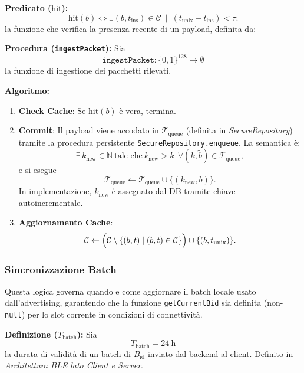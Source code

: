 \documentclass[a4paper,11pt,table,dvipsnames]{article}
\begin{document}
\textbf{Predicato (\(\text{hit}\)):}
\[
    \text{hit}(b) \iff \exists (b, t_{\text{ins}}) \in \mathcal{C}\ \mid\ (t_{\text{unix}} - t_{\text{ins}}) < \tau.
\]
la funzione che verifica la presenza recente di un payload, definita da:

\textbf{Procedura (\texttt{ingestPacket}):}
Sia
\[
    \texttt{ingestPacket}: \{0,1\}^{128} \rightarrow \emptyset
\]
la funzione di ingestione dei pacchetti rilevati.

\textbf{Algoritmo:}
\begin{enumerate}
    \item \textbf{Check Cache}:
          Se \(\text{hit}(b)\) è vera, termina.

    \item \textbf{Commit}:
          Il payload viene accodato in \(\mathcal{T}_{\text{queue}}\) (definita in \emph{SecureRepository}) tramite la procedura persistente \texttt{SecureRepository.enqueue}.
          La semantica è:
          \[
              \exists\, k_{\text{new}} \in \mathbb{N}
              \ \text{tale che}\
              k_{\text{new}} > k \ \ \forall (k,\widetilde{b})\in\mathcal{T}_{\text{queue}},
          \]
          e si esegue
          \[
              \mathcal{T}_{\text{queue}} \leftarrow \mathcal{T}_{\text{queue}} \cup \{ (k_{\text{new}}, b) \}.
          \]
          In implementazione, \(k_{\text{new}}\) è assegnato dal DB tramite chiave autoincrementale.

    \item \textbf{Aggiornamento Cache}:
          \[
              \mathcal{C} \leftarrow
              \Bigl(\mathcal{C} \setminus \{(b,t)\mid (b,t)\in\mathcal{C}\}\Bigr)
              \cup \{(b, t_{\text{unix}})\}.
          \]
\end{enumerate}

\subsubsection{Sincronizzazione Batch}
Questa logica governa quando e come aggiornare il batch locale usato dall’advertising, garantendo che la funzione \texttt{getCurrentBid} sia definita (non-\texttt{null}) per lo slot corrente in condizioni di connettività.

\textbf{Definizione (\(T_{\text{batch}}\)):}
Sia
\[
    T_{\text{batch}} = \SI{24}{\hour}
\]
la durata di validità di un batch di \(B_{\text{id}}\) inviato dal backend al client.
Definito in \emph{Architettura BLE lato Client e Server}.
\end{document}
